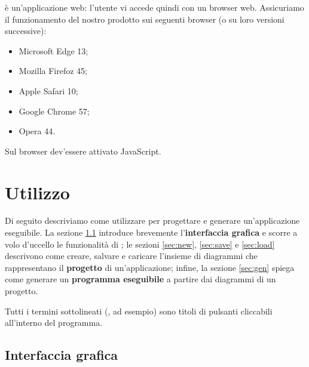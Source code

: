 \proj{} è un'applicazione web: l'utente vi accede quindi con un browser web. Assicuriamo il funzionamento del nostro prodotto sui seguenti browser (o su loro versioni successive):
\begin{itemize} %
	\item Microsoft Edge 13;
	\item Mozilla Firefoz 45;
	\item Apple Safari 10;
	\item Google Chrome 57;
	\item Opera 44.
\end{itemize}
Sul browser dev'essere attivato JavaScript.






\section{Utilizzo} \label{sec:utilizzo}

Di seguito descriviamo come utilizzare \proj{} per progettare e generare un'applicazione eseguibile. La sezione \ref{sec:gui} introduce brevemente l'\textbf{interfaccia grafica} e scorre a volo d'uccello le funzionalità di \proj; le sezioni \ref{sec:new}, \ref{sec:save} e \ref{sec:load} descrivono come creare, salvare e caricare l'insieme di diagrammi che rappresentano il \textbf{progetto} di un'applicazione; infine, la sezione \ref{sec:gen} spiega come generare un \textbf{programma eseguibile} a partire dai diagrammi di un progetto.

Tutti i termini sottolineati (, ad esempio) sono titoli di pulsanti cliccabili all'interno del programma.



\subsection{Interfaccia grafica} \label{sec:gui}

